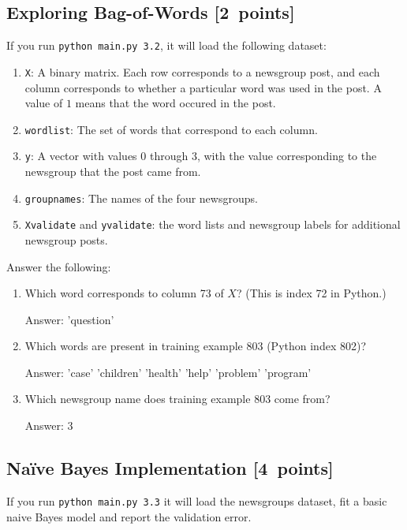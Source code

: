 \documentclass{article}
\newcommand{\blu}[1]{{\textcolor{blu}{#1}}}
\newenvironment{answer}{\par\begingroup\color{gre}Answer: }{\endgroup}
\let\ask\blu
\newcommand\pts[1]{\textcolor{pointscolour}{[#1~points]}}
\begin{document}
    \subsection{Exploring Bag-of-Words \pts{2}}

    If you run \texttt{python main.py 3.2}, it will load the following dataset:
    \begin{enumerate}
        \item \texttt{X}: A binary matrix. Each row corresponds to a newsgroup post, and each column corresponds to whether a particular word was used in the post. A value of $1$ means that the word occured in the post.
        \item \texttt{wordlist}: The set of words that correspond to each column.
        \item \texttt{y}: A vector with values $0$ through $3$, with the value corresponding to the newsgroup that the post came from.
        \item \texttt{groupnames}: The names of the four newsgroups.
        \item \texttt{Xvalidate} and \texttt{yvalidate}: the word lists and newsgroup labels for additional newsgroup posts.
    \end{enumerate}
    \ask{Answer the following}:
    \begin{enumerate}
        \item Which word corresponds to column 73 of $X$? (This is index 72 in Python.)
        \begin{answer}
            'question'
        \end{answer}
        \item Which words are present in training example 803 (Python index 802)?
        \begin{answer}
            'case' 'children' 'health' 'help' 'problem' 'program'
        \end{answer}
        \item Which newsgroup name does training example 803 come from?
        \begin{answer}
            3
        \end{answer}
    \end{enumerate}

    \subsection{Na\"ive Bayes Implementation \pts{4}}

    If you run \texttt{python main.py 3.3}
    it will load the newsgroups dataset, fit a basic naive Bayes model and report the validation error.
\end{document}
